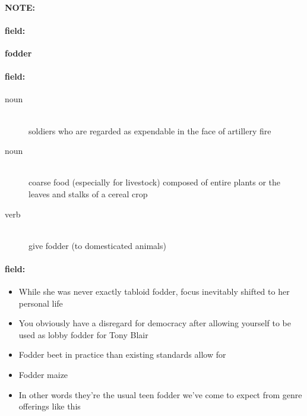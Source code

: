 \documentclass[12pt]{article}
\newenvironment{note}{\paragraph{NOTE:}}{}
\newenvironment{field}{\paragraph{field:}}{}
\begin{document}
\begin{note}
\begin{field}
\textbf{\large fodder}
\end{field}


\begin{field}
\begin{description}
\item[noun] \hfill \\ 
soldiers who are regarded as expendable in the face of artillery fire

\item[noun] \hfill \\ 
coarse food (especially for livestock) composed of entire plants or the leaves and stalks of a cereal crop

\item[verb] \hfill \\ 
give fodder (to domesticated animals)

\end{description}
\end{field}

\begin{field}
\begin{itemize}
\item While she was never exactly tabloid fodder, focus inevitably shifted to her personal life
\item You obviously have a disregard for democracy after allowing yourself to be used as lobby fodder for Tony Blair
\item Fodder beet in practice than existing standards allow for
\item Fodder maize
\item In other words they're the usual teen fodder we've come to expect from genre offerings like this
\end{itemize}
\end{field}
\end{note}
\end{document}
